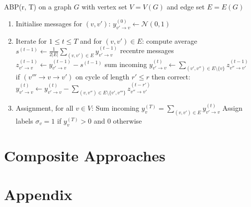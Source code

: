 \documentclass[]{article}
\newcommand{\Gaussian}{\mathcal{N}}
\begin{document}
ABP(r, T) on a graph $G$ with vertex set $V = V(G)$ and edge set $E = E(G)$
\begin{enumerate}
	\item Initialise messages for $(v, v')$:
		\subitem $y^{(0)}_{v' \rightarrow v} \leftarrow \Gaussian(0, 1)$
	\item Iterate for $1 \leq t \leq T$ and for $(v, v') \in E$:
		\subitem compute average $s^{(t-1)} \leftarrow \frac{1}{2|E|} \sum_{(v, v') \in E} y^{(t-1)}_{v' \rightarrow v}$
		\subitem recentre messages $z^{(t-1)}_{v' \rightarrow v} \leftarrow y^{(t-1)}_{v' \rightarrow v} - s^{(t-1)}$ 
		\subitem sum incoming $y^{(t)}_{v' \rightarrow v} \leftarrow \sum_{(v', v'') \in E \setminus \{v\}}z^{(t-1)}_{v'' \rightarrow v'}$
		\subitem if $(v''' \rightarrow v \rightarrow v')$ on cycle of length $r' \leq r$ then correct:
			\subsubitem $y^{(t)}_{v' \rightarrow v} \leftarrow y^{(t)}_{v' \rightarrow v} - \sum_{(v, v'') \in E \setminus \{v', v'''\}}z^{(t-r')}_{v'' \rightarrow v'}$
	\item Assignment, for all $v \in V$:
		\subitem Sum incoming $y_v^{(T)} = \sum_{(v, v') \in E} y^{(t)}_{v' \rightarrow v}$
		\subitem Assign labels $\sigma_v = 1$ if $y_v^{(T)} > 0$ and $0$ otherwise
\end{enumerate}

\section{Composite Approaches}

\section{Appendix}
\end{document}
